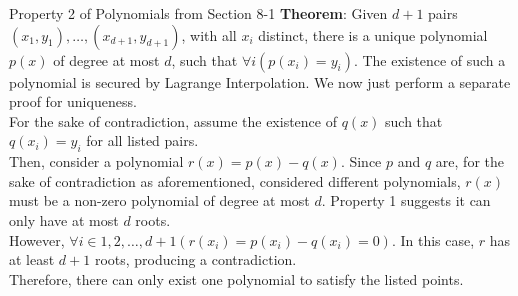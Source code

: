 \begin{ln-theorem}{Property 2 of Polynomials from Section 8-1}{}
    \textbf{Theorem}: Given $d + 1$ pairs $(x_1, y_1), \dots, (x_{d + 1}, y_{d + 1})$, with all $x_i$ distinct, there is a unique polynomial $p(x)$ of degree at most $d$, such that $\forall i (p(x_i) = y_i)$.
    \tcblower
    The existence of such a polynomial is secured by Lagrange Interpolation. We now just perform a separate proof for uniqueness. \\
    For the sake of contradiction, assume the existence of $q(x)$ such that $q(x_i) = y_i$ for all listed pairs. \\
    Then, consider a polynomial $r(x) = p(x) - q(x)$. Since $p$ and $q$ are, for the sake of contradiction as aforementioned, considered different polynomials, $r(x)$ must be a non-zero polynomial of degree at most $d$. Property 1 suggests it can only have at most $d$ roots. \\
    However, $\forall i \in {1, 2, \dots, d + 1} (r(x_i) = p(x_i) - q(x_i) = 0)$. In this case, $r$ has at least $d + 1$ roots, producing a contradiction. \\
    Therefore, there can only exist one polynomial to satisfy the listed points.
\end{ln-theorem}

